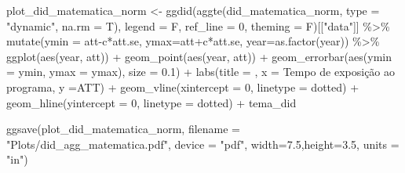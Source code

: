 \documentclass[
  letterpaper,
  DIV=11,
  numbers=noendperiod]{scrartcl}
\newenvironment{Shaded}{\begin{snugshade}}{\end{snugshade}}
\newcommand{\AttributeTok}[1]{\textcolor[rgb]{0.40,0.45,0.13}{#1}}
\newcommand{\DecValTok}[1]{\textcolor[rgb]{0.68,0.00,0.00}{#1}}
\newcommand{\FloatTok}[1]{\textcolor[rgb]{0.68,0.00,0.00}{#1}}
\newcommand{\FunctionTok}[1]{\textcolor[rgb]{0.28,0.35,0.67}{#1}}
\newcommand{\NormalTok}[1]{\textcolor[rgb]{0.00,0.23,0.31}{#1}}
\newcommand{\OtherTok}[1]{\textcolor[rgb]{0.00,0.23,0.31}{#1}}
\newcommand{\SpecialCharTok}[1]{\textcolor[rgb]{0.37,0.37,0.37}{#1}}
\newcommand{\StringTok}[1]{\textcolor[rgb]{0.13,0.47,0.30}{#1}}
\begin{document}
\begin{Shaded}
\begin{Highlighting}[]
\NormalTok{plot\_did\_matematica\_norm }\OtherTok{\textless{}{-}}
\FunctionTok{ggdid}\NormalTok{(}\FunctionTok{aggte}\NormalTok{(did\_matematica\_norm, }\AttributeTok{type =} \StringTok{"dynamic"}\NormalTok{, }\AttributeTok{na.rm =}\NormalTok{ T),       }
      \AttributeTok{legend =}\NormalTok{ F, }\AttributeTok{ref\_line =} \DecValTok{0}\NormalTok{, }\AttributeTok{theming =}\NormalTok{ F)[[}\StringTok{"data"}\NormalTok{]] }\SpecialCharTok{\%\textgreater{}\%} 
    \FunctionTok{mutate}\NormalTok{(}\AttributeTok{ymin =}\NormalTok{ att}\SpecialCharTok{{-}}\NormalTok{c}\SpecialCharTok{*}\NormalTok{att.se, }\AttributeTok{ymax=}\NormalTok{att}\SpecialCharTok{+}\NormalTok{c}\SpecialCharTok{*}\NormalTok{att.se, }\AttributeTok{year=}\FunctionTok{as.factor}\NormalTok{(year)) }\SpecialCharTok{\%\textgreater{}\%} 
    \FunctionTok{ggplot}\NormalTok{(}\FunctionTok{aes}\NormalTok{(year, att)) }\SpecialCharTok{+}
    \FunctionTok{geom\_point}\NormalTok{(}\FunctionTok{aes}\NormalTok{(year, att)) }\SpecialCharTok{+}
    \FunctionTok{geom\_errorbar}\NormalTok{(}\FunctionTok{aes}\NormalTok{(}\AttributeTok{ymin =}\NormalTok{ ymin, }\AttributeTok{ymax =}\NormalTok{ ymax), }\AttributeTok{size =} \FloatTok{0.1}\NormalTok{) }\SpecialCharTok{+}
    \FunctionTok{labs}\NormalTok{(}\AttributeTok{title =} \StringTok{\textquotesingle{}\textquotesingle{}}\NormalTok{,}
         \AttributeTok{x =} \StringTok{\textquotesingle{}Tempo de exposição ao programa\textquotesingle{}}\NormalTok{,}
         \AttributeTok{y =}\StringTok{\textquotesingle{}ATT\textquotesingle{}}\NormalTok{) }\SpecialCharTok{+}
    \FunctionTok{geom\_vline}\NormalTok{(}\AttributeTok{xintercept =} \StringTok{\textquotesingle{}0\textquotesingle{}}\NormalTok{, }\AttributeTok{linetype =} \StringTok{\textquotesingle{}dotted\textquotesingle{}}\NormalTok{) }\SpecialCharTok{+}
    \FunctionTok{geom\_hline}\NormalTok{(}\AttributeTok{yintercept =} \DecValTok{0}\NormalTok{, }\AttributeTok{linetype =} \StringTok{\textquotesingle{}dotted\textquotesingle{}}\NormalTok{) }\SpecialCharTok{+}
\NormalTok{    tema\_did}

\FunctionTok{ggsave}\NormalTok{(plot\_did\_matematica\_norm, }
       \AttributeTok{filename =} \StringTok{"Plots/did\_agg\_matematica.pdf"}\NormalTok{,}
       \AttributeTok{device =} \StringTok{"pdf"}\NormalTok{,}
       \AttributeTok{width=}\FloatTok{7.5}\NormalTok{,}\AttributeTok{height=}\FloatTok{3.5}\NormalTok{, }\AttributeTok{units =} \StringTok{"in"}\NormalTok{)}


\end{Highlighting}
\end{Shaded}
\end{document}
